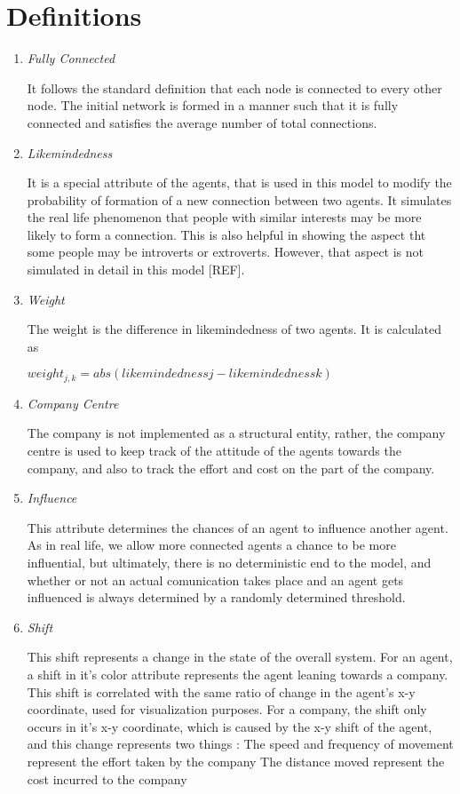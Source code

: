 \clearpage

\section{Definitions}
\begin{enumerate}
\item \emph{Fully Connected}

It follows the standard definition that each node is connected to every other node. The initial network is formed in a manner such that it is fully connected and satisfies the average number of total connections.

\item \emph{Likemindedness}

It is a special attribute of the agents, that is used in this model to modify the probability of formation of a new connection between two agents. It simulates the real life phenomenon that people with similar interests may be more likely to form a connection. This is also helpful in showing the aspect tht some people may be introverts or extroverts. However, that aspect is not simulated in detail in this model [REF].

\item \emph{Weight}

The weight is the difference in likemindedness of two agents. It is calculated as 

$weight_{j,k} = abs( likemindedness{j} - likemindedness{k} )$

\item \emph{Company Centre}

The company is not implemented as a structural entity, rather, the company centre is used to keep track of the attitude of the agents towards the company, and also to track the effort and cost on the part of the company.

\item \emph{Influence}

This attribute determines the chances of an agent to influence another agent. As in real life, we allow more connected agents a chance to be more influential, but ultimately, there is no deterministic end to the model, and whether or not an actual comunication takes place and an agent gets influenced is always determined by a randomly determined threshold.

\item \emph{Shift}

This shift represents a change in the state of the overall system. For an agent, a shift in it's color attribute represents the agent leaning towards a company. This shift is correlated with the same ratio of change in the agent's x-y coordinate, used for visualization purposes.
For a company, the shift only occurs in it's x-y coordinate, which is caused by the x-y shift of the agent, and this change represents two things : 
\subitem[A] The speed and frequency of movement represent the effort taken by the company
\subitem[B] The distance moved represent the cost incurred to the company
\end{enumerate}